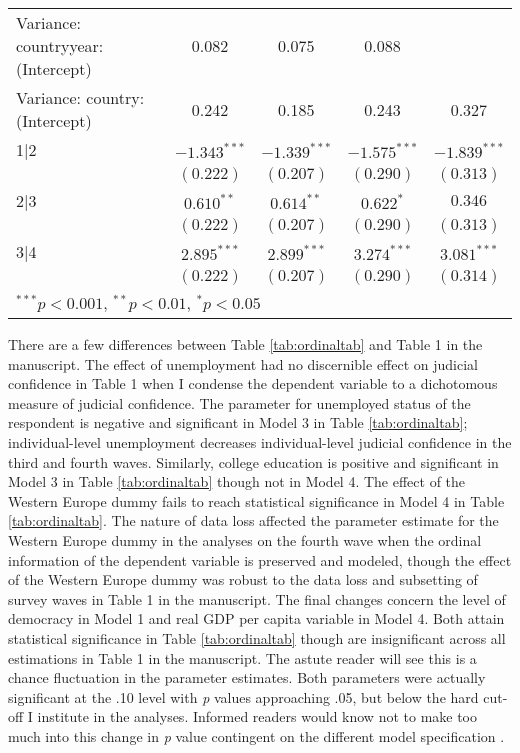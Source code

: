 \documentclass[11pt,]{article}
\begin{document}
\begin{table}
\begin{center}
\begin{tabular}{l c c c c }
Variance: countryyear: (Intercept)       & 0.082          & 0.075          & 0.088          &                \\
Variance: country: (Intercept)           & 0.242          & 0.185          & 0.243          & 0.327          \\
1|2                                      & $-1.343^{***}$ & $-1.339^{***}$ & $-1.575^{***}$ & $-1.839^{***}$ \\
                                         & $(0.222)$      & $(0.207)$      & $(0.290)$      & $(0.313)$      \\
2|3                                      & $0.610^{**}$   & $0.614^{**}$   & $0.622^{*}$    & $0.346$        \\
                                         & $(0.222)$      & $(0.207)$      & $(0.290)$      & $(0.313)$      \\
3|4                                      & $2.895^{***}$  & $2.899^{***}$  & $3.274^{***}$  & $3.081^{***}$  \\
                                         & $(0.222)$      & $(0.207)$      & $(0.290)$      & $(0.314)$      \\
\hline
\multicolumn{5}{l}{\scriptsize{$^{***}p<0.001$, $^{**}p<0.01$, $^*p<0.05$}}
\end{tabular}
\end{center}
\end{table}

There are a few differences between Table \ref{tab:ordinaltab} and Table
1 in the manuscript. The effect of unemployment had no discernible
effect on judicial confidence in Table 1 when I condense the dependent
variable to a dichotomous measure of judicial confidence. The parameter
for unemployed status of the respondent is negative and significant in
Model 3 in Table \ref{tab:ordinaltab}; individual-level unemployment
decreases individual-level judicial confidence in the third and fourth
waves. Similarly, college education is positive and significant in Model
3 in Table \ref{tab:ordinaltab} though not in Model 4. The effect of the
Western Europe dummy fails to reach statistical significance in Model 4
in Table \ref{tab:ordinaltab}. The nature of data loss affected the
parameter estimate for the Western Europe dummy in the analyses on the
fourth wave when the ordinal information of the dependent variable is
preserved and modeled, though the effect of the Western Europe dummy was
robust to the data loss and subsetting of survey waves in Table 1 in the
manuscript. The final changes concern the level of democracy in Model 1
and real GDP per capita variable in Model 4. Both attain statistical
significance in Table \ref{tab:ordinaltab} though are insignificant
across all estimations in Table 1 in the manuscript. The astute reader
will see this is a chance fluctuation in the parameter estimates. Both
parameters were actually significant at the .10 level with \emph{p}
values approaching .05, but below the hard cut-off I institute in the
analyses. Informed readers would know not to make too much into this
change in \emph{p} value contingent on the different model specification
\citep[e.g.][]{gelmanstern2006dbs}.
\end{document}
